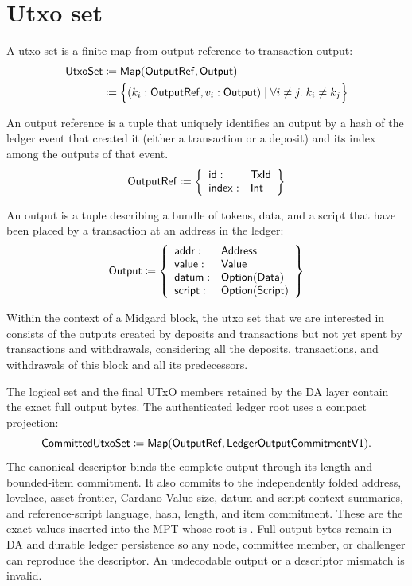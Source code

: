 \documentclass[../midgard.tex]{subfiles}
\begin{document}
\section{Utxo set}
\label{h:utxo-set}

A utxo set is a finite map from output reference to transaction output:
\begin{align*}
    \mathsf{UtxoSet} &\coloneq \mathsf{Map(OutputRef, Output)} \\
      &\coloneq \Bigl\{
        (k_i: \mathsf{OutputRef}, v_i: \mathsf{Output}) \mid \forall i \neq j.\; k_i \neq k_j
    \Bigr\}
\end{align*}

An output reference is a tuple that uniquely identifies an output by a hash of the ledger event that created it (either a transaction or a deposit) and its index among the outputs of that event.
\begin{equation*}
    \mathsf{OutputRef} \coloneq \left\{
    \begin{array}{ll}
        \mathsf{id} : & \mathsf{TxId} \\
        \mathsf{index} : & \mathsf{Int}
    \end{array} \right\}
\end{equation*}

An output is a tuple describing a bundle of tokens, data, and a script that have been placed by a transaction at an address in the ledger:
\begin{equation*}
    \mathsf{Output} \coloneq \left\{
    \begin{array}{ll}
        \mathsf{addr} : & \mathsf{Address} \\
        \mathsf{value} : & \mathsf{Value} \\
        \mathsf{datum} : & \mathsf{Option(Data)} \\
        \mathsf{script} : & \mathsf{Option(Script)}
    \end{array} \right\}
\end{equation*}

Within the context of a Midgard block, the utxo set that we are interested in consists of the outputs created by deposits and transactions but not yet spent by transactions and withdrawals, considering all the deposits, transactions, and withdrawals of this block and all its predecessors.

The logical set and the final UTxO members retained by the DA layer contain the
exact full output bytes. The authenticated ledger root uses a compact
projection:
\begin{equation*}
  \mathsf{CommittedUtxoSet}
    \coloneq \mathsf{Map(OutputRef, LedgerOutputCommitmentV1)}.
\end{equation*}
The canonical  descriptor binds the complete
output through its length and bounded-item commitment. It also commits to the
independently folded address, lovelace, asset frontier, Cardano Value size,
datum and script-context summaries, and reference-script language, hash,
length, and item commitment. These are the exact values inserted into the MPT
whose root is . Full output bytes remain in DA and durable
ledger persistence so any node, committee member, or challenger can reproduce
the descriptor. An undecodable output or a descriptor mismatch is invalid.


\todo

\todo
\end{document}
